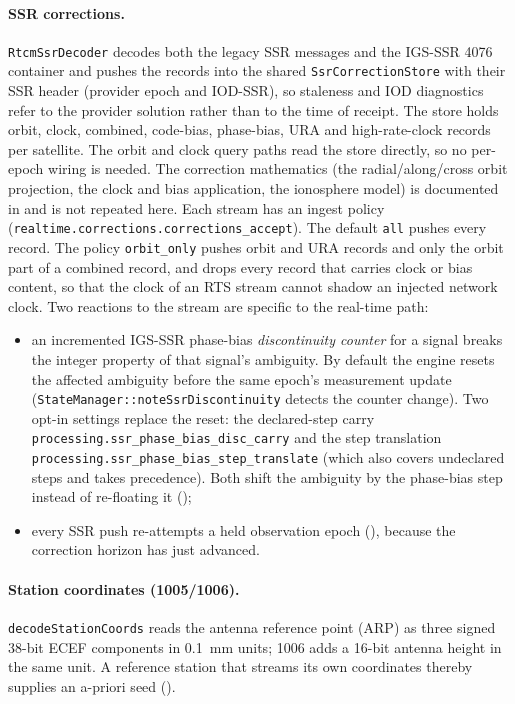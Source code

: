 \documentclass[main.tex]{subfiles}
\begin{document}
\paragraph{SSR corrections.}
\texttt{RtcmSsrDecoder} decodes both the legacy SSR messages and the
IGS-SSR 4076 container and pushes the records into the shared
\texttt{SsrCorrectionStore} with their SSR header (provider epoch and
IOD-SSR), so staleness and IOD diagnostics refer to the provider
solution rather than to the time of receipt.  The store holds orbit,
clock, combined, code-bias, phase-bias, URA and high-rate-clock records
per satellite.  The orbit and clock query paths read the store directly,
so no per-epoch wiring is needed.  The correction mathematics (the
radial/along/cross orbit projection, the clock and bias application, the
ionosphere model) is documented in  and is not repeated here.  Each stream has an ingest policy
(\texttt{realtime.corrections.corrections\_accept}).  The default
\texttt{all} pushes every record.  The policy \texttt{orbit\_only} pushes
orbit and URA records and only the orbit part of a combined record, and drops
every record that carries clock or bias content, so that the clock of an RTS
stream cannot shadow an injected network clock.  Two reactions to the stream are
specific to the real-time path:
\begin{itemize}[leftmargin=*, itemsep=0pt]
\item an incremented IGS-SSR phase-bias \emph{discontinuity counter}
      for a signal breaks the integer property of that signal's
      ambiguity.  By default the engine resets the affected ambiguity
      before the same epoch's measurement update
      (\texttt{StateManager::noteSsrDiscontinuity} detects the counter
      change).  Two opt-in settings replace the reset: the declared-step
      carry \texttt{processing.ssr\_phase\_bias\_disc\_carry} and the step
      translation \texttt{processing.ssr\_phase\_bias\_step\_translate}
      (which also covers undeclared steps and takes precedence).  Both
      shift the ambiguity by the phase-bias step instead of re-floating it
      ();
\item every SSR push re-attempts a held observation epoch
      (), because the correction horizon has just
      advanced.
\end{itemize}

\paragraph{Station coordinates (1005/1006).}
\texttt{decodeStationCoords} reads the antenna reference point (ARP) as
three signed 38-bit ECEF components in \SI{0.1}{\milli\metre} units;
1006 adds a 16-bit antenna height in the same unit.  A reference
station that streams its own coordinates thereby supplies an a-priori
seed ().
\end{document}
